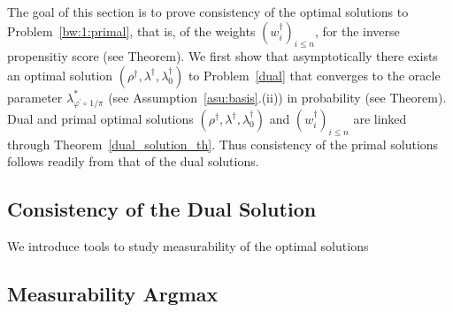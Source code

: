 The goal of this section is to prove consistency of the optimal solutions to Problem~\ref{bw:1:primal}, that is, of the weights 
$(w^\dagger_i)_{i\le n}$,
for the inverse propensitiy score (see Theorem).
We first show that asymptotically there exists an optimal solution 
$(\rho^\dagger,\lambda^\dagger,\lambda_0^\dagger)$
to Problem~\ref{dual} that converges to the oracle parameter
$
\lambda^*_{\varphi^{'}\circ\,1/\pi}
$
(see Assumption~\ref{asu:basis}.(ii))
in probability (see Theorem).
Dual and primal optimal solutions
$(\rho^\dagger,\lambda^\dagger,\lambda_0^\dagger)$
and
$(w^\dagger_i)_{i\le n}$
are linked through Theorem~\ref{dual_solution_th}.
Thus consistency of the primal solutions follows readily from that of the dual solutions.

\subsection{Consistency of the Dual Solution}
  


We introduce tools to study measurability of the optimal solutions
\subsection{Measurability Argmax}
  
